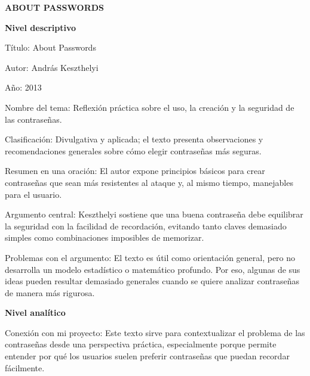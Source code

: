 \documentclass[12pt, letterpaper]{article}
\begin{document}
\begin{center}
    \vspace{0.8cm}
    {\Large \bfseries ABOUT PASSWORDS} \\
    \vspace{0.4cm}
\end{center}

\vspace{1.5cm}

\noindent
\textbf{Nivel descriptivo} \newline

\noindent
Título: About Passwords \newline

\noindent
Autor: András Keszthelyi \newline

\noindent
Año: 2013 \newline

\noindent
Nombre del tema: Reflexión práctica sobre el uso, la creación y la seguridad de las contraseñas. \newline

\noindent
Clasificación: Divulgativa y aplicada; el texto presenta observaciones y recomendaciones generales sobre cómo elegir contraseñas más seguras.\newline

\noindent
Resumen en una oración: El autor expone principios básicos para crear contraseñas que sean más resistentes al ataque y, al mismo tiempo, manejables para el usuario. \newline

\noindent
Argumento central: Keszthelyi sostiene que una buena contraseña debe equilibrar la seguridad con la facilidad de recordación, evitando tanto claves demasiado simples como combinaciones imposibles de memorizar.\newline

\noindent
Problemas con el argumento: El texto es útil como orientación general, pero no desarrolla un modelo estadístico o matemático profundo. Por eso, algunas de sus ideas pueden resultar demasiado generales cuando se quiere analizar contraseñas de manera más rigurosa.
\newpage 

\noindent
\textbf{Nivel analítico} \newline

\noindent
Conexión con mi proyecto: Este texto sirve para contextualizar el problema de las contraseñas desde una perspectiva práctica, especialmente porque permite entender por qué los usuarios suelen preferir contraseñas que puedan recordar fácilmente.\newline
\end{document}
